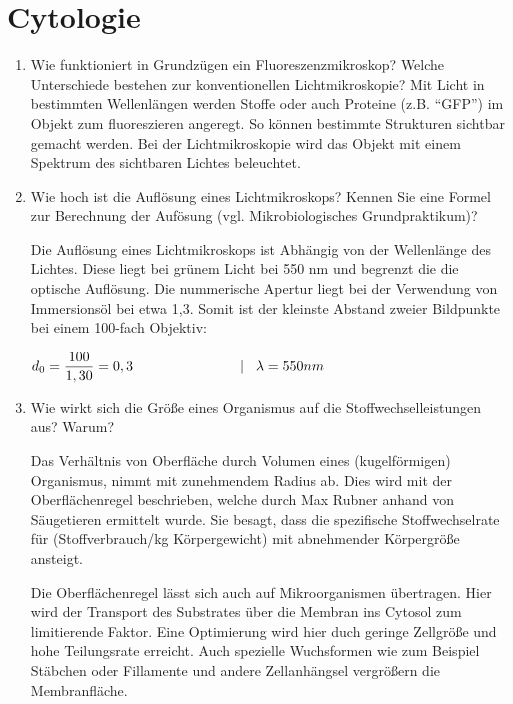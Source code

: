 
\section{Cytologie}
\label{sec:cytologie}
	\begin{enumerate}
		\item Wie funktioniert in Grundzügen ein Fluoreszenzmikroskop? Welche Unterschiede bestehen zur konventionellen Lichtmikroskopie?				
			Mit Licht in bestimmten Wellenlängen werden Stoffe
			oder auch Proteine (z.B. ``GFP'') im Objekt zum	fluoreszieren angeregt.
			So können bestimmte Strukturen sichtbar gemacht werden.
			Bei der Lichtmikroskopie wird das Objekt mit einem Spektrum des sichtbaren Lichtes
			beleuchtet.

		\item\label{tab:quest_cyt_resolution} Wie hoch ist die Auflösung eines Lichtmikroskops?
			Kennen Sie eine Formel zur Berechnung der Aufösung (vgl. Mikrobiologisches Grundpraktikum)?

		Die Auflösung eines Lichtmikroskops ist Abhängig von der Wellenlänge des Lichtes.
		Diese liegt bei grünem Licht bei 550 nm und begrenzt die die optische Auflösung.
		Die nummerische Apertur liegt bei der Verwendung von Immersionsöl bei etwa 1,3.
		Somit ist der kleinste Abstand zweier Bildpunkte bei einem 100-fach Objektiv:

		\begin{center}
		\begin{math}
			d_{0} = \dfrac{100}{1,30} = 0,3 \hspace{27mm} |\hspace{3mm} \lambda = 550nm
		\end{math}
		\end{center}

		\item Wie wirkt sich die Größe eines Organismus auf die Stoffwechselleistungen aus? Warum?
			
			Das Verhältnis von Oberfläche durch Volumen eines (kugelförmigen) Organismus,
			nimmt mit zunehmendem Radius ab.
			Dies wird mit der Oberflächenregel beschrieben, welche durch Max Rubner anhand von Säugetieren ermittelt wurde.
			Sie besagt, dass die spezifische Stoffwechselrate für (Stoffverbrauch/kg Körpergewicht)
			mit abnehmender Körpergröße ansteigt.

			Die Oberflächenregel lässt sich auch auf Mikroorganismen übertragen.
			Hier wird der Transport des Substrates über die Membran ins Cytosol zum limitierende Faktor.
			Eine Optimierung wird hier duch geringe Zellgröße und hohe Teilungsrate erreicht.
			Auch spezielle Wuchsformen wie zum Beispiel Stäbchen
			oder Fillamente und andere Zellanhängsel vergrößern die Membranfläche.


\end{enumerate}
